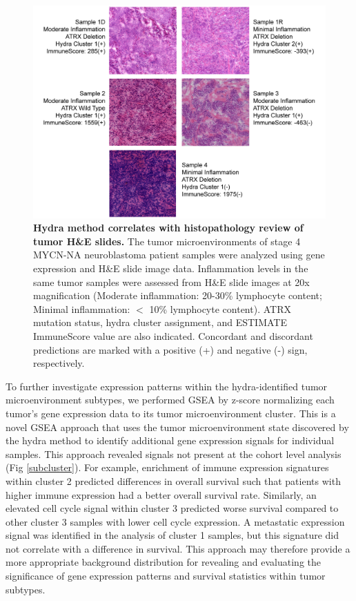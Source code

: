 \documentclass[10pt,letterpaper]{article}
\begin{document}
\begin{figure}[!h]
	\includegraphics[width=\textwidth]{img/PNG/NBL-MYCN-NA-HE-2x}
	\caption{{\bf Hydra method correlates with histopathology review of tumor H\&E slides.}
		The tumor microenvironments of stage 4 MYCN-NA neuroblastoma patient samples were analyzed using gene expression and H\&E slide image data. Inflammation levels in the same tumor samples were assessed from H\&E slide images at 20x magnification (Moderate inflammation: 20-30\% lymphocyte content; Minimal inflammation: $<$ 10\% lymphocyte content). ATRX mutation status, hydra cluster assignment, and ESTIMATE ImmuneScore value are also indicated. Concordant and discordant predictions are marked with a positive (+) and negative (-) sign, respectively.}
	\label{hefig}
\end{figure}

To further investigate expression patterns within the hydra-identified tumor microenvironment subtypes, we performed GSEA by z-score normalizing each tumor’s gene expression data to its tumor microenvironment cluster. This is a novel GSEA approach that uses the tumor microenvironment state discovered by the hydra method to identify additional gene expression signals for individual samples. This approach revealed signals not present at the cohort level analysis (Fig \ref{subcluster}). For example, enrichment of immune expression signatures within cluster 2 predicted differences in overall survival such that patients with higher immune expression had a better overall survival rate. Similarly, an elevated cell cycle signal within cluster 3 predicted worse survival compared to other cluster 3 samples with lower cell cycle expression. A metastatic expression signal was identified in the analysis of cluster 1 samples, but this signature did not correlate with a difference in survival. This approach may therefore provide a more appropriate background distribution for revealing and evaluating the significance of gene expression patterns and survival statistics within tumor subtypes.
\end{document}
